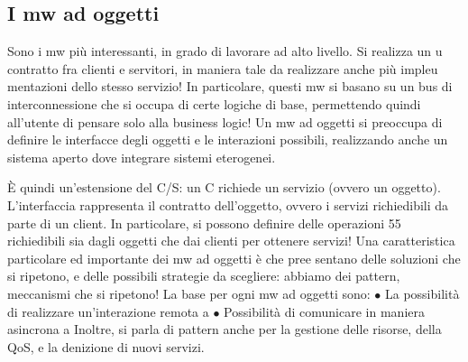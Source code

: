 \documentclass[a4paper,12pt]{article}
\begin{document}
\subsection{I mw ad oggetti}
Sono i mw più interessanti, in grado di lavorare ad alto livello. Si realizza un
u
contratto fra clienti e servitori, in maniera tale da realizzare anche più impleu
mentazioni dello stesso servizio! In particolare, questi mw si basano su un bus
di interconnessione che si occupa di certe logiche di base, permettendo quindi
all'utente di pensare solo alla business logic! Un mw ad oggetti si preoccupa di
definire le interfacce degli oggetti e le interazioni possibili, realizzando anche un
sistema aperto dove integrare sistemi eterogenei.

È quindi un'estensione del C/S: un C richiede un servizio (ovvero un oggetto). L'interfaccia rappresenta il contratto
dell'oggetto, ovvero i servizi richiedibili da parte di un client. In particolare, si possono definire delle operazioni
55
richiedibili sia dagli oggetti che dai clienti per ottenere servizi!
Una caratteristica particolare ed importante dei mw ad oggetti è che pree
sentano delle soluzioni che si ripetono, e delle possibili strategie da scegliere:
abbiamo dei pattern, meccanismi che si ripetono!
La base per ogni mw ad oggetti sono:
$\bullet$ La possibilità di realizzare un'interazione remota
a
$\bullet$ Possibilità di comunicare in maniera asincrona
a
Inoltre, si parla di pattern anche per la gestione delle risorse, della QoS, e la
denizione di nuovi servizi.
\end{document}
